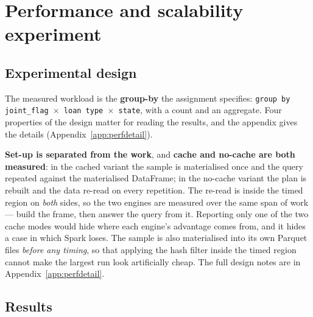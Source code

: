 \documentclass[sigconf,balance=false]{acmart}
\begin{document}

\section{Performance and scalability experiment}\label{sec:performance}

\subsection{Experimental design}\label{sec:performance:design}

The measured workload is the \textbf{group-by} the assignment specifies:
\texttt{group by joint\_\allowbreak flag $\times$ loan type $\times$ state}, with a
count and an aggregate. Four properties of the design matter for reading
the results, and the appendix gives the details
(Appendix~\ref{app:perfdetail}).

\textbf{Set-up is separated from the work}, and \textbf{cache and
no-cache are both measured}: in the cached variant the sample is
materialised once and the query repeated against the materialised
DataFrame; in the no-cache variant the plan is rebuilt and the data
re-read on every repetition. The re-read is inside the timed region on
\emph{both} sides, so the two engines are measured over the same span of
work --- build the frame, then answer the query from it. Reporting only
one of the two cache modes would hide where each engine's advantage comes
from, and it hides a case in which Spark loses. The sample is also
materialised into its own Parquet files \emph{before any timing}, so that
applying the hash filter inside the timed region cannot make the largest
run look artificially cheap. The full design notes are in
Appendix~\ref{app:perfdetail}.

\subsection{Results}
\end{document}
